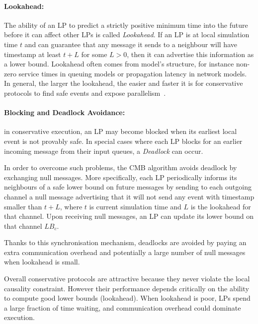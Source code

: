 \paragraph{Lookahead:} The ability of an \ac{LP} to predict a strictly
positive minimum time into the future before it can affect other \ac{LP}s
is called \emph{Lookahead}. If an \ac{LP} is at local simulation time
$t$ and can guarantee that any message it sends to a neighbour will have
timestamp at least $t + L$ for some $L > 0$, then it can advertise this
information as a lower bound. Lookahead often comes from model's structure, for
instance non-zero service times in queuing models or propagation latency in
network models. In general, the larger the lookahead, the easier and faster it
is for conservative protocols to find safe events and expose
parallelism~\cite{fujimoto1988LPDES}.

\paragraph{Blocking and Deadlock Avoidance:} in conservative execution, an
\ac{LP} may become blocked when its earliest local event is not provably safe.
In special cases where each \ac{LP} blocks for an earlier incoming message from
their input queues, a \emph{Deadlock} can occur.

In order to overcome such problems, the \ac{CMB} algorithm \newline
\cite{chandyMisra1983DDD, bryant1977simulation} avoids deadlock by exchanging
null messages. More specifically, each \ac{LP} periodically informs its
neighbours of a safe lower bound on future messages by sending to each outgoing
channel a null message advertising that it will not send any event with
timestamp smaller than $t + L$, where $t$ is current simulation time and $L$ is
the lookahead for that channel. Upon receiving null messages, an \ac{LP} can
update its lower bound on that channel $LB_c$.

Thanks to this synchronisation mechanism, deadlocks are avoided by paying an
extra communication overhead and potentially a large number of null messages
when lookahead is small.
\\
\newline

Overall conservative protocols are attractive because they never violate the
local causality constraint. However their performance depends critically on the
ability to compute good lower bounds (lookahead). When lookahead is poor,
\ac{LP}s spend a large fraction of time waiting, and communication overhead
could dominate execution.

